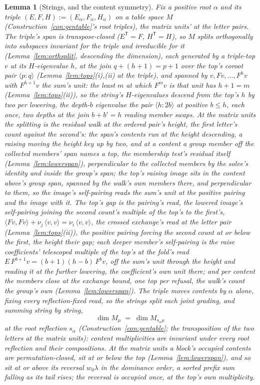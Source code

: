 \documentclass[11pt]{article}
\newtheorem{lemma}{Lemma}
\theoremstyle{definition}
\begin{document}
\begin{lemma}[Strings, and the content symmetry]\label{lem:strings}
Fix a positive root $\alpha$ and its triple
$(E,F,H):=(E_\alpha,F_\alpha,H_\alpha)$ on
a table space $M$ (Construction~\ref{con:gentable}'s root
triples), the matrix
units' at the letter pairs. The triple's span is
transpose-closed ($E^{\mathsf T}=F$, $H^{\mathsf T}=H$), so $M$ splits
orthogonally into subspaces invariant for the triple and irreducible for
it (Lemma~\ref{lem:orthsplit}, descending the dimension), each generated
by a triple-top $v$ at its $H$-eigenvalue $h$, at the join
$q+(h+1)=p+1$ over the top's coroot pair $\langle p\!:\!q\rangle$
(Lemma~\ref{lem:tops}(i),(ii) at the
triple), and spanned by
$v,Fv,\dots,F^hv$ with $F^{h+1}v$ the sum's unit: the least $m$ at
which $F^mv$ is that unit has
$h+1=m$ (Lemma~\ref{lem:tops}(ii)), so the string's $H$-eigenvalues
descend from the top's $h$ by two per lowering, the depth-$b$ eigenvalue
the pair $\langle h\!:\!2b\rangle$ at positive $b\le h$, each
once, two depths at the join $b+b'=h$ reading member swaps. At
the matrix units the splitting is the residual walk at the ordered
pair's height, the first letter's count against the second's: the
span's contents run at the height descending, a raising moving the
height key up by two, and at a content a group member off the
collected members' span names a top, the membership test's
residual itself (Lemma~\ref{lem:lowerspan}), perpendicular to the
collected members by the solve's identity and inside the group's
span; the top's raising image sits in the content above's group
span, spanned by the walk's own members there, and perpendicular
to them, so the image's self-pairing reads the sum's unit at the
positive pairing and the image with it. The top's gap is the
pairing's read, the lowered image's self-pairing joining the
second count's multiple of the top's to the first's,
$\langle Fv,Fv\rangle+\nu_j\,\langle v,v\rangle
=\nu_i\,\langle v,v\rangle$, the crossed exchange's read at
the letter pair (Lemma~\ref{lem:tops}(ii)), the positive pairing
forcing the second count at or below the first, the height their
gap; each deeper member's
self-pairing is the raise coefficients' telescoped multiple of the
top's at the fold's read
$E\,F^{b+1}v=(b{+}1)(h{-}b)\,F^{b}v$, off the sum's unit through
the height and reading it at the further lowering, the
coefficient's own unit there; and per content the members close at
the exchange bound, one top per refusal, the walk's count the
group's own (Lemma~\ref{lem:lowerspan}). The triple moves contents by $\alpha$ alone,
fixing every reflection-fixed read, so the strings split each joint
grading, and
summing string by string,
\[
\dim M_\mu\;=\;\dim M_{s_\alpha\mu}
\]
at the root reflection $s_\alpha$
(Construction~\ref{con:gentable}; the
transposition of the two letters at the matrix
units): content
multiplicities are invariant under every root reflection and
their compositions. At the matrix units a block's
occupied contents are permutation-closed, sit at or below the top
(Lemma~\ref{lem:lowerspan}), and so sit at or above its reversal
$w_0\lambda$ in the dominance order, a sorted prefix sum falling as its
tail rises; the reversal is occupied once, at the top's own
multiplicity.
\end{lemma}
\end{document}
